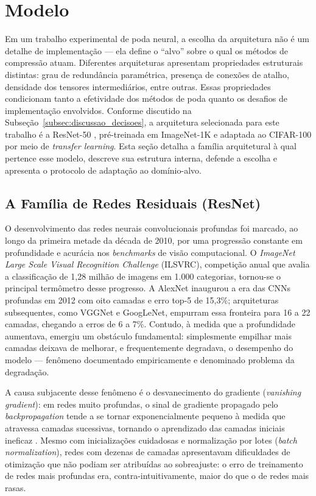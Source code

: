 \section{Modelo}\label{sec:modelo}

Em um trabalho experimental de poda neural, a escolha da arquitetura não é um detalhe de implementação --- ela define o ``alvo'' sobre o qual os métodos de compressão atuam. Diferentes arquiteturas apresentam propriedades estruturais distintas: grau de redundância paramétrica, presença de conexões de atalho, densidade dos tensores intermediários, entre outras. Essas propriedades condicionam tanto a efetividade dos métodos de poda quanto os desafios de implementação envolvidos. Conforme discutido na Subseção~\ref{subsec:discussao_decisoes}, a arquitetura selecionada para este trabalho é a ResNet-50 \cite{He2016}, pré-treinada em ImageNet-1K e adaptada ao CIFAR-100 por meio de \textit{transfer learning}. Esta seção detalha a família arquitetural à qual pertence esse modelo, descreve sua estrutura interna, defende a escolha e apresenta o protocolo de adaptação ao domínio-alvo.

\subsection{A Família de Redes Residuais (ResNet)}\label{subsec:familia_resnet}

O desenvolvimento das redes neurais convolucionais profundas foi marcado, ao longo da primeira metade da década de 2010, por uma progressão constante em profundidade e acurácia nos \textit{benchmarks} de visão computacional. O \textit{ImageNet Large Scale Visual Recognition Challenge} (ILSVRC), competição anual que avalia a classificação de 1,28 milhão de imagens em 1.000 categorias, tornou-se o principal termômetro desse progresso. A AlexNet \cite{Krizhevsky2012} inaugurou a era das CNNs profundas em 2012 com oito camadas e erro top-5 de 15,3\%; arquiteturas subsequentes, como VGGNet e GoogLeNet, empurram essa fronteira para 16 a 22 camadas, chegando a erros de 6 a 7\%. Contudo, à medida que a profundidade aumentava, emergiu um obstáculo fundamental: simplesmente empilhar mais camadas deixava de melhorar, e frequentemente degradava, o desempenho do modelo --- fenômeno documentado empiricamente e denominado problema da degradação.

A causa subjacente desse fenômeno é o desvanecimento do gradiente (\textit{vanishing gradient}): em redes muito profundas, o sinal de gradiente propagado pelo \textit{backpropagation} tende a se tornar exponencialmente pequeno à medida que atravessa camadas sucessivas, tornando o aprendizado das camadas iniciais ineficaz \cite{Goodfellow2016}. Mesmo com inicializações cuidadosas e normalização por lotes (\textit{batch normalization}), redes com dezenas de camadas apresentavam dificuldades de otimização que não podiam ser atribuídas ao sobreajuste: o erro de treinamento de redes mais profundas era, contra-intuitivamente, maior do que o de redes mais rasas.

